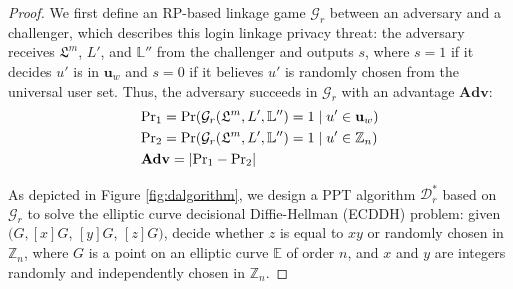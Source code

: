 \begin{theorem}
\begin{proof}
  We first define an RP-based linkage game $\mathcal{G}_r$ between an adversary and a challenger, which describes this login linkage privacy threat: the adversary receives $\mathfrak{L}^m$, $L'$, and $\mathbb{L}''$ from the challenger and outputs $s$, where $s = 1$ if it decides $u'$ is in $\mathbf{u}_w$ %
  and $s=0$ if it believes $u'$ is randomly chosen from the universal user set.
  Thus, the adversary succeeds in $\mathcal{G}_r$ with an advantage $\mathbf{Adv}$:
  \begin{align*}
  &{\rm Pr}_1={\rm Pr}(\mathcal{G}_r(\mathfrak{L}^m, L', \mathbb{L}'')=1 \;| \; u' \in \mathbf{u}_w)  \\
  &{\rm Pr}_2={\rm Pr}(\mathcal{G}_r(\mathfrak{L}^m, L', \mathbb{L}'')=1 \; | \; u' \in \mathbb{Z}_n)\\
  &{\mathbf{Adv}}=|{\rm Pr}_1-{\rm Pr}_2|
  \end{align*}

  As depicted in Figure \ref{fig:dalgorithm}, we design a PPT algorithm $\mathcal{D}^*_r$ based on $\mathcal{G}_r$ to solve the elliptic curve decisional Diffie-Hellman (ECDDH) problem: given $(G, [x]G$, $[y]G$, $[z]G)$, decide whether $z$ is equal to $xy$ or randomly chosen in $\mathbb{Z}_n$, where $G$ is a point on an elliptic curve $\mathbb{E}$ of order $n$, and $x$ and $y$ are integers randomly and independently chosen in $\mathbb{Z}_n$.


\end{proof}
\end{theorem}

